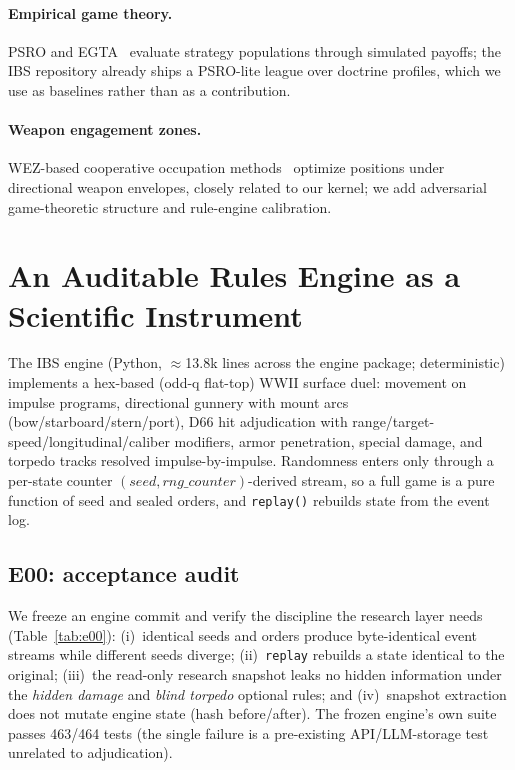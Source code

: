 \documentclass[12pt,a4paper]{article}
\begin{document}
\paragraph{Empirical game theory.}  PSRO and EGTA~\citep{lanctot2017,
bighashdel2024,wellman2024,omidshafiei2019,adam2021} evaluate strategy
populations through simulated payoffs; the IBS repository already ships a
PSRO-lite league over doctrine profiles, which we use as baselines rather
than as a contribution.

\paragraph{Weapon engagement zones.}  WEZ-based cooperative occupation
methods~\citep{wez2022} optimize positions under directional weapon
envelopes, closely related to our kernel; we add adversarial game-theoretic
structure and rule-engine calibration.

\section{An Auditable Rules Engine as a Scientific Instrument}
\label{sec:audit}

The IBS engine (Python, $\approx$13.8k lines across the engine package;
deterministic) implements a
hex-based (odd-q flat-top) WWII surface duel: movement on impulse
programs, directional gunnery with mount arcs (bow/starboard/stern/port),
D66 hit adjudication with range/target-speed/longitudinal/caliber
modifiers, armor penetration, special damage, and torpedo tracks resolved
impulse-by-impulse.  Randomness enters only through a per-state counter
$({seed},{rng\_counter})$-derived stream, so a full game is a pure
function of seed and sealed orders, and \texttt{replay()} rebuilds state
from the event log.

\subsection{E00: acceptance audit}
We freeze an engine commit and verify the discipline the research layer
needs (Table~\ref{tab:e00}):
(i)~identical seeds and orders produce byte-identical event streams while
different seeds diverge; (ii)~\texttt{replay} rebuilds a state identical
to the original; (iii)~the read-only research snapshot leaks no hidden
information under the \emph{hidden damage} and \emph{blind torpedo}
optional rules; and (iv)~snapshot extraction does not mutate engine state
(hash before/after).  The frozen engine's own suite passes 463/464 tests
(the single failure is a pre-existing API/LLM-storage test unrelated to
adjudication).
\end{document}
